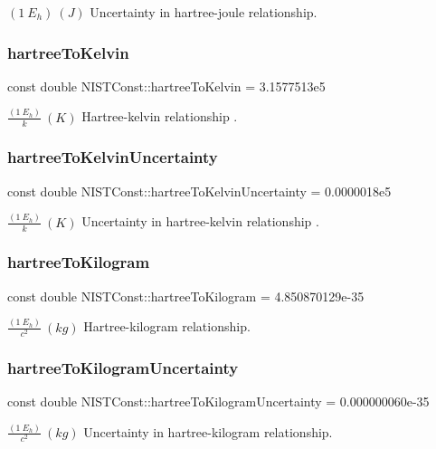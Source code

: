 $(1\ E_h) \ (J)$ Uncertainty in hartree-\/joule relationship. \mbox{\label{group___hartree_ga5468b69d29f43719e4642f9c5248e546}} 
\subsubsection{\texorpdfstring{hartree\+To\+Kelvin}{hartreeToKelvin}}
{\footnotesize\ttfamily const double N\+I\+S\+T\+Const\+::hartree\+To\+Kelvin = 3.\+1577513e5}

$\frac{(1\ E_h)}{k} \ (K)$ Hartree-\/kelvin relationship . \mbox{\label{group___hartree_gace6578c3f664e11b0eba73a20efd7f16}} 
\subsubsection{\texorpdfstring{hartree\+To\+Kelvin\+Uncertainty}{hartreeToKelvinUncertainty}}
{\footnotesize\ttfamily const double N\+I\+S\+T\+Const\+::hartree\+To\+Kelvin\+Uncertainty = 0.\+0000018e5}

$\frac{(1\ E_h)}{k} \ (K)$ Uncertainty in hartree-\/kelvin relationship . \mbox{\label{group___hartree_ga1184624f36892653b10c2bb068541f82}} 
\subsubsection{\texorpdfstring{hartree\+To\+Kilogram}{hartreeToKilogram}}
{\footnotesize\ttfamily const double N\+I\+S\+T\+Const\+::hartree\+To\+Kilogram = 4.\+850870129e-\/35}

$\frac{(1\ E_h)}{c^2} \ (kg)$ Hartree-\/kilogram relationship. \mbox{\label{group___hartree_ga88a5e0e81776199fdc7d4b5a424196a8}} 
\subsubsection{\texorpdfstring{hartree\+To\+Kilogram\+Uncertainty}{hartreeToKilogramUncertainty}}
{\footnotesize\ttfamily const double N\+I\+S\+T\+Const\+::hartree\+To\+Kilogram\+Uncertainty = 0.\+000000060e-\/35}

$\frac{(1\ E_h)}{c^2} \ (kg)$ Uncertainty in hartree-\/kilogram relationship. 